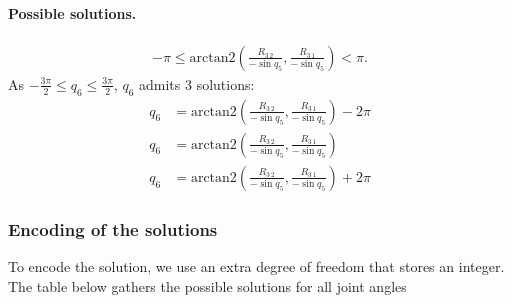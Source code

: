 \documentclass{article}
\begin{document}
\paragraph{Possible solutions.}

\begin{align*}
  -\pi \leq \mbox{arctan2}(\frac{R_{3\,2}}{-\sin q_5}, \frac{R_{3\,1}}{-\sin q_5}) < \pi.
\end{align*}
As $-\frac{3\pi}{2} \leq q_6 \leq \frac{3\pi}{2}$, $q_6$ admits 3 solutions:
\begin{align*}
  q_6 &= \mbox{arctan2}(\frac{R_{3\,2}}{-\sin q_5}, \frac{R_{3\,1}}{-\sin q_5}) -2\pi \\
  q_6 &= \mbox{arctan2}(\frac{R_{3\,2}}{-\sin q_5}, \frac{R_{3\,1}}{-\sin q_5}) \\
  q_6 &= \mbox{arctan2}(\frac{R_{3\,2}}{-\sin q_5}, \frac{R_{3\,1}}{-\sin q_5}) + 2\pi
\end{align*}

\subsubsection*{Encoding of the solutions}

To encode the solution, we use an extra degree of freedom that stores an integer. The table below
gathers the possible solutions for all joint angles
\end{document}
